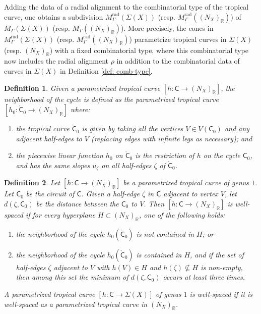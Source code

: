 \documentclass{article}
\def\R{\mathbb{R}}
\newtheorem{definition}{Definition}[section]
\newcommand{\tropC}{\mathsf{C}}
\newcommand{\rad}{\mathrm{rad}}
\newcommand{\nbhdtropC}{\mathring{\tropC}_0}
\begin{document}
Adding the data of a radial alignment to the combinatorial type of the tropical curve, one obtains a subdivision $M^{\rad}_\Gamma(\Sigma(X))$ (resp. $M^{\rad}_\Gamma( (N_X)_\R)$) of $M_\Gamma(\Sigma(X))$ (resp. $M_\Gamma( (N_X)_\R)$). More precisely, the cones in $M^{\rad}_\Gamma(\Sigma(X))$ (resp. $M^{\rad}_\Gamma( (N_X)_\R)$)  parametrize tropical curves in $\Sigma(X)$ (resp. $(N_X)_\R$) with a fixed combinatorial type, where this combinatorial type now includes the radial alignment $\rho$ in addition to the combinatorial data of curves in $\Sigma(X)$ in Definition \ref{def: comb-type}. 
    
    
    
    
    


    \begin{definition} \label{def: nbhd-cycle}
    Given a parametrized tropical curve $[h: \tropC \rightarrow (N_X)_{\mathbb{R}}]$, the neighborhood of the cycle is defined as the parametrized tropical curve $[h_0: \nbhdtropC \rightarrow (N_X)_{\mathbb{R}}]$ where:
    \begin{enumerate}
        \item the tropical curve $\nbhdtropC$ is given by taking all the vertices $V \in V(\tropC_0)$ and any adjacent half-edges to $V$ (replacing edges with infinite legs as necessary); and 
        \item the piecewise linear function $h_0$ on $\nbhdtropC$ is the restriction of $h$ on the cycle $\tropC_0$, and has the same slopes $u_{\zeta}$ on all half-edges $\zeta$ of $\nbhdtropC$. 
    \end{enumerate}
    \end{definition}

    \begin{definition}\cite[Definition 4.4.4.]{RSWII} 
        Let $[h:\tropC \rightarrow (N_X)_{\mathbb{R}}]$ be a parametrized tropical curve of genus $1$. Let $\tropC_0$ be the circuit of $\tropC$. Given a half-edge $\zeta$ in $\tropC$ adjacent to vertex $V$, let $d(\zeta,\tropC_0)$ be the distance between the $\tropC_0$ to $V$. Then $[h:\tropC \rightarrow (N_X)_{\mathbb{R}}]$ is well-spaced if for every hyperplane $H \subset (N_X)_{\mathbb{R}}$, one of the following holds: 
        \begin{enumerate}[label=(\arabic*)]
            \item the neighborhood of the cycle $h_0(\nbhdtropC)$ is not contained in $H$; or
            \item the neighborhood of the cycle $h_0(\nbhdtropC)$ is contained in $H$, and if the set of half-edges $\zeta$ adjacent to $V$ with $h(V) \in H$ and $h(\zeta) \nsubseteq H$ is non-empty, then among this set the minimum of $d(\zeta, \tropC_0)$ occurs at least three times. 
        \end{enumerate}

        A parametrized tropical curve $[h:\tropC \rightarrow \Sigma(X)]$ of genus $1$ is well-spaced if it is well-spaced as a parametrized tropical curve in $(N_X)_{\mathbb{R}}$.
    \end{definition}
\end{document}
